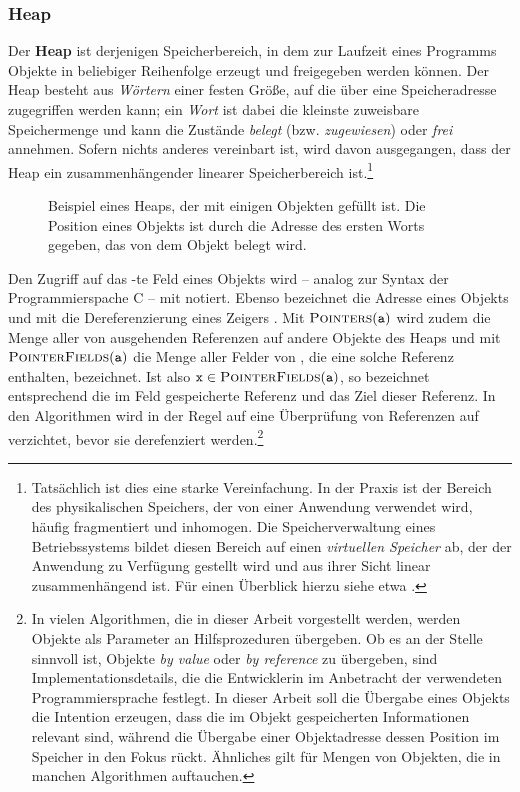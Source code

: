 \subsubsection*{Heap}
Der \textbf{Heap} ist derjenigen Speicherbereich, in dem zur Laufzeit eines Programms Objekte in beliebiger Reihenfolge erzeugt und freigegeben werden können.
Der Heap besteht aus \textit{Wörtern} einer festen Größe, auf die über eine Speicheradresse zugegriffen werden kann; ein \textit{Wort} ist dabei die kleinste zuweisbare Speichermenge und kann die Zustände \textit{belegt} (bzw. \textit{zugewiesen}) oder \textit{frei} annehmen.
Sofern nichts anderes vereinbart ist, wird davon ausgegangen, dass der Heap ein zusammenhängender linearer Speicherbereich ist.\footnote{Tatsächlich ist dies eine starke Vereinfachung.
In der Praxis ist der Bereich des physikalischen Speichers, der von einer Anwendung verwendet wird, häufig fragmentiert und inhomogen.
Die Speicherverwaltung eines Betriebssystems bildet diesen Bereich auf einen \textit{virtuellen Speicher} ab, der der Anwendung zu Verfügung gestellt wird und aus ihrer Sicht linear zusammenhängend ist.
Für einen Überblick hierzu siehe etwa \cite[Kap. 3.3]{tanenbaum}.}

\begin{figure}[h]
	\centering
	
	\caption[Beispiel eines Heaps mit Objekten]{Beispiel eines Heaps, der mit einigen Objekten gefüllt ist. Die Position eines Objekts ist durch die Adresse des ersten Worts gegeben, das von dem Objekt belegt wird.}
	\label{fig:heap}
\end{figure}

Den Zugriff auf das -te Feld eines Objekts  wird -- analog zur Syntax der Programmierspache C -- mit  notiert.
Ebenso bezeichnet  die Adresse eines Objekts und mit  die Dereferenzierung eines Zeigers .
Mit $\textsc{Pointers}(\texttt{a})$ wird zudem die Menge aller von  ausgehenden Referenzen auf andere Objekte des Heaps und mit $\textsc{PointerFields}(\texttt{a})$ die Menge aller Felder von , die eine solche Referenz enthalten, bezeichnet.
Ist also $\texttt{x} \in \textsc{PointerFields}(\texttt{a})$, so bezeichnet  entsprechend die im Feld gespeicherte Referenz und  das Ziel dieser Referenz.
In den Algorithmen wird in der Regel auf eine Überprüfung von Referenzen auf \Null verzichtet, bevor sie derefenziert werden.\footnote{In vielen Algorithmen, die in dieser Arbeit vorgestellt werden, werden Objekte als Parameter an Hilfsprozeduren übergeben.
Ob es an der Stelle sinnvoll ist, Objekte \textit{by value} oder \textit{by reference} zu übergeben, sind Implementationsdetails, die die Entwicklerin im Anbetracht der verwendeten Programmiersprache festlegt.
In dieser Arbeit soll die Übergabe eines Objekts die Intention erzeugen, dass die im Objekt gespeicherten Informationen relevant sind, während die Übergabe einer Objektadresse dessen Position im Speicher in den Fokus rückt.
Ähnliches gilt für Mengen von Objekten, die in manchen Algorithmen auftauchen.}

